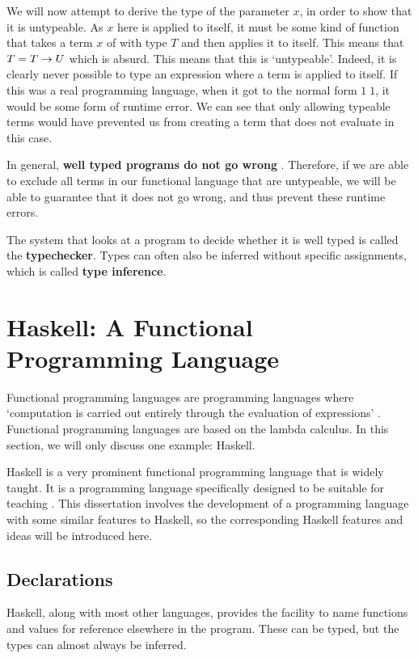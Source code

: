 We will now attempt to derive the type of the parameter $x$, in order to show that it is untypeable.
As $x$ here is applied to itself, it must be some kind of function that takes a term $x$ of with type $T$ and then applies it to itself. This means that $T = T \rightarrow U$ which is absurd. This means that this is `untypeable'. Indeed, it is clearly never possible to type an expression where a term is applied to itself. If this was a real programming language, when it got to the normal form \(1\;1\), it would be some form of runtime error. We can see that only allowing typeable terms would have prevented us from creating a term that does not evaluate in this case. 

In general, \textbf{well typed programs do not go wrong} \cite{MILNER1978348}. Therefore, if we are able to exclude all terms in our functional language that are untypeable, we will be able to guarantee that it does not go wrong, and thus prevent these runtime errors. 

The system that looks at a program to decide whether it is well typed is called the \textbf{typechecker}. Types can often also be inferred without specific assignments, which is called \textbf{type inference}.

\section{Haskell: A Functional Programming Language}
Functional programming languages are programming languages where `computation is carried out entirely through the evaluation of expressions' \cite{hudak1989conceptionfunctionalprogranning}. Functional programming languages are based on the lambda calculus. In this section, we will only discuss one example: Haskell. 

Haskell is a very prominent functional programming language that is widely taught. It is a programming language specifically designed to be suitable for teaching \cite{hudak2007history}. This dissertation involves the development of a programming language with some similar features to Haskell, so the corresponding Haskell features and ideas will be introduced here. 

\subsection{Declarations}
Haskell, along with most other languages, provides the facility to name functions and values for reference elsewhere in the program. These can be typed, but the types can almost always be inferred. 

